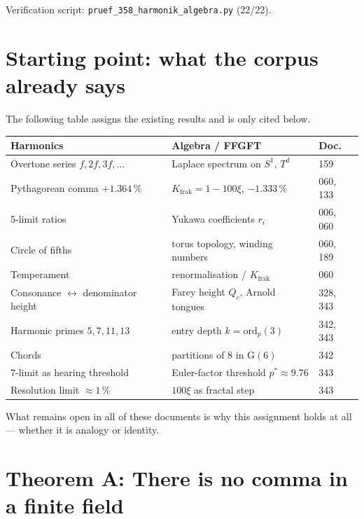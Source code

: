 Verification script: \texttt{pruef\_358\_harmonik\_algebra.py} (22/22).

\section{Starting point: what the corpus already says}

The following table assigns the existing results and is only cited below.

\begin{center}
\begin{tabular}{@{}lll@{}}
\toprule
Harmonics & Algebra / FFGFT & Doc. \\
\midrule
Overtone series $f, 2f, 3f,\dots$ & Laplace spectrum on $S^1$, $T^d$ & 159 \\
Pythagorean comma $+1.364\,\%$ & $K_\text{frak}=1-100\xi$, $-1.333\,\%$ & 060, 133 \\
5-limit ratios & Yukawa coefficients $r_i$ & 006, 060 \\
Circle of fifths & torus topology, winding numbers & 060, 189 \\
Temperament & renormalisation / $K_\text{frak}$ & 060 \\
Consonance $\leftrightarrow$ denominator height & Farey height $Q_c$, Arnold tongues & 328, 343 \\
Harmonic primes $5,7,11,13$ & entry depth $k=\mathrm{ord}_p(3)$ & 342, 343 \\
Chords & partitions of 8 in G$(6)$ & 342 \\
7-limit as hearing threshold & Euler-factor threshold $p^*\approx9.76$ & 343 \\
Resolution limit $\approx1\,\%$ & $100\xi$ as fractal step & 343 \\
\bottomrule
\end{tabular}
\end{center}

What remains open in all of these documents is why this assignment holds
at all --- whether it is analogy or identity.

\section{Theorem A: There is no comma in a finite field}

